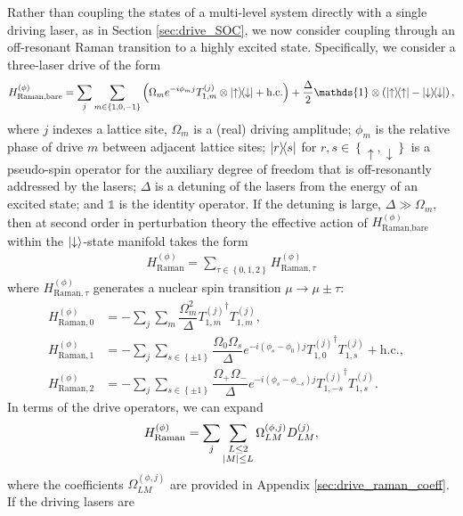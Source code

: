 \documentclass[nofootinbib,notitlepage,11pt]{revtex4-2}
\renewcommand{\t}{\text} %
\newcommand{\f}[2]{\dfrac{#1}{#2}} %
\newcommand{\p}[1]{\left(#1\right)} %
\renewcommand{\set}[1]{\left\{#1\right\}} %
\newcommand{\1}{\mathds{1}}
\newcommand{\up}{\uparrow}
\newcommand{\dn}{\downarrow}
\begin{document}
Rather than coupling the states of a multi-level system directly with
a single driving laser, as in Section \ref{sec:drive_SOC}, we now
consider coupling through an off-resonant Raman transition to a highly
excited state.  Specifically, we consider a three-laser drive of the
form
\begin{align}
  H_{\t{Raman,bare}}^{(\phi)}
  = \sum_j \sum_{m\in\set{1,0,-1}} \p{\Omega_m e^{-i\phi_m j}
    T_{1,m}^{(j)} \otimes \op{\up}{\dn} + \t{h.c.}}
  + \f{\Delta}{2} \1 \otimes \p{\op{\up} - \op{\dn}},
  \label{eq:raman_bare}
\end{align}
where $j$ indexes a lattice site, $\Omega_m$ is a (real) driving
amplitude; $\phi_m$ is the relative phase of drive $m$ between
adjacent lattice sites; $\op{r}{s}$ for $r,s\in\set{\up,\dn}$ is a
pseudo-spin operator for the auxiliary degree of freedom that is
off-resonantly addressed by the lasers; $\Delta$ is a detuning of the
lasers from the energy of an excited state; and $\1$ is the identity
operator.  If the detuning is large, $\Delta\gg\Omega_m$, then at
second order in perturbation theory the effective action of
$H_{\t{Raman,bare}}^{(\phi)}$ within the $\ket{\dn}$-state manifold
takes the form
\begin{align}
  H_{\t{Raman}}^{(\phi)}
  = \sum_{\tau\in\set{0,1,2}} H_{\t{Raman},\tau}^{(\phi)}
\end{align}
where $H_{\t{Raman},\tau}^{(\phi)}$ generates a nuclear spin
transition $\mu\to\mu\pm\tau$:
\begin{align}
  H_{\t{Raman},0}^{(\phi)}
  &= -\sum_j\sum_m \f{\Omega_m^2}{\Delta}
  {T_{1,m}^{(j)}}^\dag T_{1,m}^{(j)}, & \label{eq:raman_0} \\
  H_{\t{Raman},1}^{(\phi)}
  &= -\sum_j\sum_{s\in\set{\pm1}}
  \f{\Omega_0\Omega_s}{\Delta} e^{-i\p{\phi_s-\phi_0} j}
  {T_{1,0}^{(j)}}^\dag T_{1,s}^{(j)} + \t{h.c.},
  \\
  H_{\t{Raman},2}^{(\phi)}
  &= -\sum_j\sum_{s\in\set{\pm1}}
  \f{\Omega_+\Omega_-}{\Delta} e^{-i\p{\phi_s-\phi_{-s}}j}
  {T_{1,-s}^{(j)}}^\dag T_{1,s}^{(j)}.
  \label{eq:raman_2}
\end{align}
In terms of the drive operators, we can expand
\begin{align}
  H_{\t{Raman}}^{(\phi)}
  = \sum_j \sum_{\substack{L\le2\\\abs{M}\le L}}
  \Omega_{LM}^{(\phi,j)} D_{LM}^{(j)},
  \label{eq:raman_drive}
\end{align}
where the coefficients $\Omega_{LM}^{(\phi,j)}$ are provided in
Appendix \ref{sec:drive_raman_coeff}.  If the driving lasers are
\end{document}
